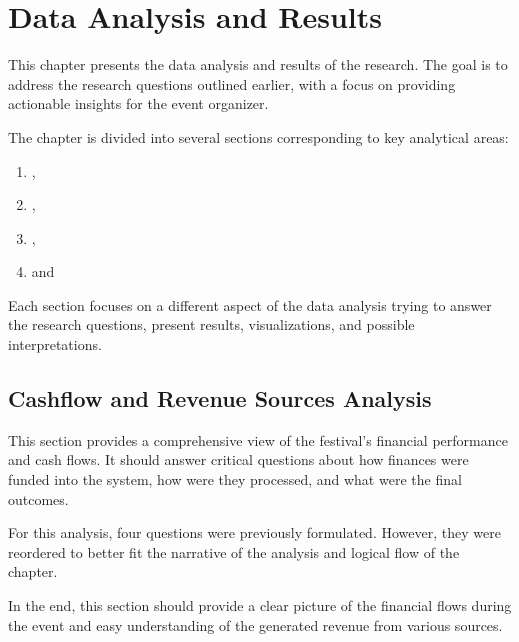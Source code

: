 \chapter{Data Analysis and Results}
\label{ch:data-analysis-and-results}

This chapter presents the data analysis and results of the research.
The goal is to address the research questions outlined earlier, with a focus on providing actionable insights for the event organizer.

The chapter is divided into several sections corresponding to key analytical areas:\\
\begin{enumerate}
	\item {},
	\item {},
	\item {},
	\item and~
\end{enumerate}

Each section focuses on a different aspect of the data analysis trying to answer the research questions, present results, visualizations, and possible interpretations.



\section{Cashflow and Revenue Sources Analysis}
\label{sec:analysis-cashflow-and-revenue-sources}

This section provides a comprehensive view of the festival's financial performance and cash flows.
It should answer critical questions about how finances were funded into the system, how were they processed, and what were the final outcomes.

For this analysis, four questions were previously formulated.
However, they were reordered to better fit the narrative of the analysis and logical flow of the chapter.

In the end, this section should provide a clear picture of the financial flows during the event and easy understanding of the generated revenue from various sources.

